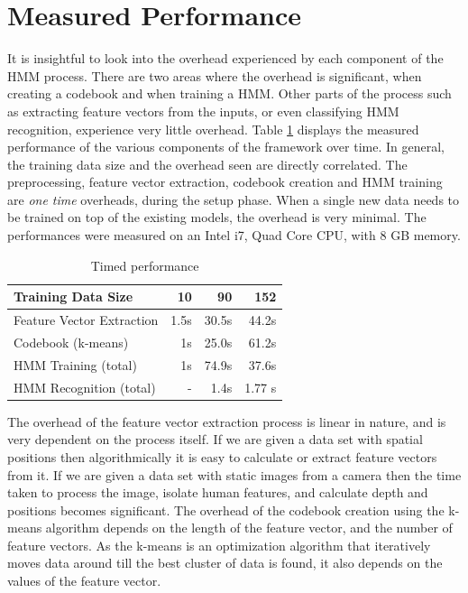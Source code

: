 \documentclass[]{report}   %
\begin{document}
\section{Measured Performance}
It is insightful to look into the overhead experienced by each component of the HMM process. There are two areas where the overhead is significant, when creating a codebook and when training a HMM. Other parts of the process such as extracting feature vectors from the inputs, or even classifying HMM recognition, experience very little overhead. Table \ref{tab:timedperformance} displays the measured performance of the various components of the framework over time. In general, the training data size and the overhead seen are directly correlated. The preprocessing, feature vector extraction, codebook creation and HMM training are \textit{one time} overheads, during the setup phase. When a single new data needs to be trained on top of the existing models, the overhead is very minimal. The performances were measured on an Intel i7, Quad Core CPU, with 8 GB memory.

\begin{table}[htbp]
	\centering
		\begin{tabular}{|l||r|r|r|}
		\hline
		Training Data Size  		& 10 & 90	& 152 \\ \hline
        Feature Vector Extraction 	&	1.5s & 30.5s     & 44.2s    \\ \hline
        Codebook (k-means)  		& 1s & 25.0s     & 61.2s    \\ \hline
        HMM Training (total) 		&1s & 74.9s     & 37.6s    \\ \hline
        HMM Recognition (total) 	& - & 1.4s     & 1.77 s    \\ \hline
		\end{tabular}
	\caption{Timed performance}
	\label{tab:timedperformance}
\end{table}

The overhead of the feature vector extraction process is linear in nature, and is very dependent on the process itself. If we are given a data set with spatial positions then algorithmically it is easy to calculate or extract feature vectors from it. If we are given a data set with static images from a camera then the time taken to process the image, isolate human features, and calculate depth and positions becomes significant. The overhead of the codebook creation using the k-means algorithm depends on the length of the feature vector, and the number of feature vectors. As the k-means is an optimization algorithm that iteratively moves data around till the best cluster of data is found\cite{Bottou95convergenceproperties}, it also depends on the values of the feature vector. 
\end{document}
